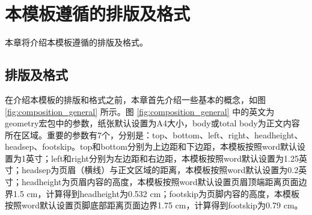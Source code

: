 \chapter{本模板遵循的排版及格式}
\label{cha:format}
本章将介绍本模板遵循的排版及格式。
\section{排版及格式}
\label{sec:composition}
在介绍本模板的排版和格式之前，本章首先介绍一些基本的概念，如图 \ref{fig:composition_general} 所示。图 \ref{fig:composition_general} 中的英文为geometry宏包中的参数，纸张默认设置为A4大小，body或total body为正文内容所在区域。重要的参数有7个，分别是：top、bottom、left、right、headheight、headsep、footskip。top和bottom分别为上边距和下边距，本模板按照word默认设置为1英寸；left和right分别为左边距和右边距，本模板按照word默认设置为1.25英寸；headsep为页眉（横线）与正文区域的距离，本模板按照word默认设置为0.2英寸；headheight为页眉内容的高度，本模板按照word默认设置页眉顶端距离页面边界1.5 cm，计算得到headheight为0.532 cm；footskip为页脚内容的高度，本模板按照word默认设置页脚底部距离页面边界1.75 cm，计算得到footskip为0.79 cm。


